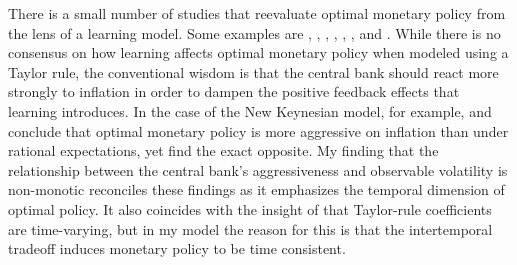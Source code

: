 \documentclass[11pt]{article}
\renewcommand{\[}{\begin{equation}}
\renewcommand{\]}{\end{equation}}
\begin{document}
%

There is a small number of studies that reevaluate optimal monetary policy from the lens of a learning model. Some examples are \cite{orphanides2005decline}, \cite{gaspar2006adaptive}, \cite{evans2006monetary}, \cite{ferrero2007monetary}, \cite{PRESTON2008}, \cite{molnar2014optimal}, \cite{eusepi2018science} and \cite{eusepi2018limits}. While there is no consensus on how learning affects optimal monetary policy when modeled using a Taylor rule, the conventional wisdom is that the central bank should react more strongly to inflation in order to dampen the positive feedback effects that learning introduces. In the case of the New Keynesian model, for example, \cite{eusepi2018science} and \cite{molnar2014optimal} conclude that optimal monetary policy is more aggressive on inflation than under rational expectations, yet \cite{eusepi2018limits} find the exact opposite. My finding that the relationship between the central bank's aggressiveness and observable volatility is non-monotic reconciles these findings as it emphasizes the temporal dimension of optimal policy. It also coincides with the insight of \cite{LUBIK201685} that Taylor-rule coefficients are time-varying, but in my model the reason for this is that the intertemporal tradeoff induces monetary policy to be time consistent. 
\end{document}
